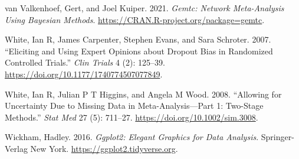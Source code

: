 \begin{CSLReferences}{1}{0}
\leavevmode{}%
van Valkenhoef, Gert, and Joel Kuiper. 2021. \emph{Gemtc: Network Meta-Analysis Using Bayesian Methods}. \url{https://CRAN.R-project.org/package=gemtc}.

\leavevmode{}%
White, Ian R, James Carpenter, Stephen Evans, and Sara Schroter. 2007. {``Eliciting and Using Expert Opinions about Dropout Bias in Randomized Controlled Trials.''} \emph{Clin Trials} 4 (2): 125--39. \url{https://doi.org/10.1177/1740774507077849}.

\leavevmode{}%
White, Ian R, Julian P T Higgins, and Angela M Wood. 2008. {``Allowing for Uncertainty Due to Missing Data in Meta-Analysis---Part 1: Two-Stage Methods.''} \emph{Stat Med} 27 (5): 711--27. \url{https://doi.org/10.1002/sim.3008}.

\leavevmode{}%
Wickham, Hadley. 2016. \emph{Ggplot2: Elegant Graphics for Data Analysis}. Springer-Verlag New York. \url{https://ggplot2.tidyverse.org}.

\end{CSLReferences}



\address{%
Loukia M. Spineli\\
Midwifery Research and Education Unit\\%
Hannover Medical School\\ Carl-Neuber-Strasse 1, 30625, Hannover, Germany\\
%
\url{https://www.github.com/LoukiaSpin}\\%
\textit{ORCiD: \href{https://orcid.org/0000-0001-9515-582X}{0000-0001-9515-582X}}\\%
\href{mailto:Spineli.Loukia@mh-hannover.de}{\nolinkurl{Spineli.Loukia@mh-hannover.de}}%
}

\address{%
Chrysostomos Kalyvas\\
Biostatistics and Research Decision Sciences\\%
MSD Europe Inc., Brussels, Belgium\\
%
\url{https://www.github.com/ckalyvas}\\%
\textit{ORCiD: \href{https://orcid.org/0000-0003-0606-4518}{0000-0003-0606-4518}}\\%
\href{mailto:chrysostomos.kalyvas@merck.com}{\nolinkurl{chrysostomos.kalyvas@merck.com}}%
}

\address{%
Katerina Papadimitropoulou\\
Health Economics and Market Access\\%
Amaris Consulting, Lyon, France\\
%
\url{https://www.github.com/Katerina-Pap}\\%
\textit{ORCiD: \href{https://orcid.org/0000-0002-5732-4044}{0000-0002-5732-4044}}\\%
\href{mailto:katerina.papadimitropoulou@gmail.com}{\nolinkurl{katerina.papadimitropoulou@gmail.com}}%
}
